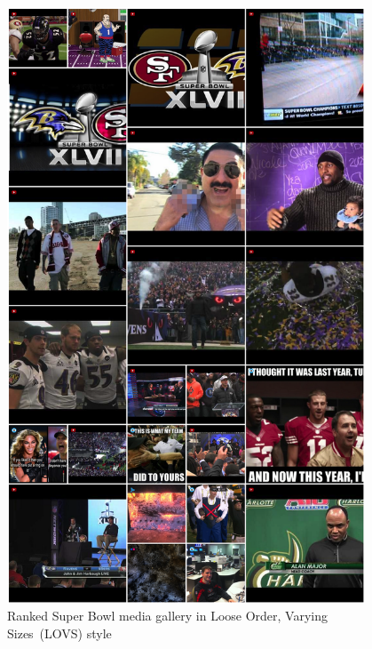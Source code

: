 \begin{figure}[!ht]
  \centering
  \includegraphics[width=0.95\textwidth,height=0.9\textheight,keepaspectratio]{loose_order.png}
  \caption[Ranked Super Bowl media gallery in Loose Order, Varying Sizes style]
  {Ranked Super Bowl media gallery in Loose Order, Varying Sizes~(LOVS) style}
  \label{fig:loose_order}
\end{figure}

